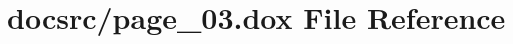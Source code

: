 \hypertarget{page__03_8dox}{\section{docsrc/page\-\_\-03.dox File Reference}
\label{page__03_8dox}
}
